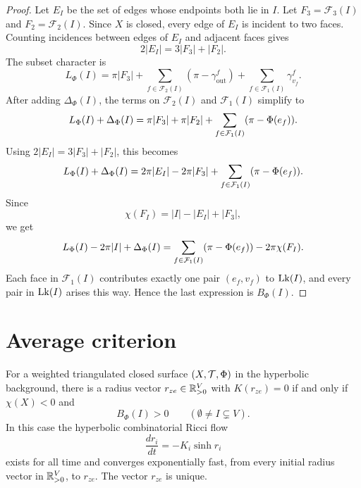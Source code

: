 \begin{proof}
Let $E_I$ be the set of edges whose endpoints both lie in $I$.  Let
$F_3=\mathcal F_3(I)$ and $F_2=\mathcal F_2(I)$.  Since $X$ is closed,
every edge of $E_I$ is incident to two faces.  Counting incidences between
edges of $E_I$ and adjacent faces gives
\[
  2|E_I|=3|F_3|+|F_2|.
\]
The subset character is
\[
  L_\Phi(I)
  =
  \pi|F_3|
  +\sum_{f\in\mathcal F_2(I)}(\pi-\gamma_{\mathrm{out}}^f)
  +\sum_{f\in\mathcal F_1(I)}\gamma_{v_f}^f .
\]
After adding $\Delta_\Phi(I)$, the terms on $\mathcal F_2(I)$ and
$\mathcal F_1(I)$ simplify to
\[
  L_\Phi(I)+\Delta_\Phi(I)
  =
  \pi|F_3|+\pi|F_2|
  +\sum_{f\in\mathcal F_1(I)}(\pi-\Phi(e_f)).
\]
Using $2|E_I|=3|F_3|+|F_2|$, this becomes
\[
  L_\Phi(I)+\Delta_\Phi(I)
  =
  2\pi |E_I|-2\pi |F_3|
  +\sum_{f\in\mathcal F_1(I)}(\pi-\Phi(e_f)).
\]
Since
\[
  \chi(F_I)=|I|-|E_I|+|F_3|,
\]
we get
\[
  L_\Phi(I)-2\pi |I|+\Delta_\Phi(I)
  =
  \sum_{f\in\mathcal F_1(I)}(\pi-\Phi(e_f))-2\pi\chi(F_I).
\]
Each face in $\mathcal F_1(I)$ contributes exactly one pair $(e_f,v_f)$ to
$\operatorname{Lk}(I)$, and every pair in $\operatorname{Lk}(I)$ arises this way.  Hence the last
expression is $B_\Phi(I)$.
\end{proof}

\section{Average criterion}

\begin{theorem}\label{thm:chow-luo}
For a weighted triangulated closed surface $(X,\mathcal T,\Phi)$ in the hyperbolic
background, there is a radius vector $r_{ze}\in\mathbb R_{>0}^V$ with
$K(r_{ze})=0$ if and only if $\chi(X)<0$ and
\[
  B_\Phi(I)>0
  \qquad
  (\emptyset\ne I\subsetneq V).
\]
In this case the hyperbolic combinatorial Ricci flow
\[
  \frac{dr_i}{dt}=-K_i\sinh r_i
\]
exists for all time and converges exponentially fast, from every initial
radius vector in $\mathbb R_{>0}^V$, to $r_{ze}$.  The vector $r_{ze}$ is unique.
\end{theorem}

